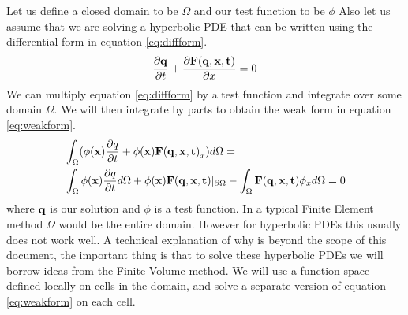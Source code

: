 \documentclass[10]{amsart}
\begin{document}
Let us define a closed domain to be $\Omega$ and our test function to be $\phi$   
Also let us assume that we are solving a hyperbolic PDE that can be written using the differential form in equation
\eqref{eq:diffform}.
\begin{equation}
 \frac{\partial {\bf q}}{\partial t} + \frac{\partial {\bf F(q,x,t)}}{\partial x}=0
 \label{eq:diffform}
\end{equation}
We can multiply equation \ref{eq:diffform} by a test function and integrate over some domain $\Omega$. 
We will then integrate by parts to obtain the weak
form in equation \eqref{eq:weakform}.
\begin{align}
 &\int_{\Omega} (\phi({\bf x}) \frac{\partial q}{\partial t} + \phi({\bf x})  {\bf F(q,x,t)}_x) d\Omega
=\nonumber \\ 
&\int_{\Omega} \phi({\bf x}) \frac{\partial q}{\partial t} d\Omega +  \phi({\bf x}) {\bf F(q,x,t)} |_{\partial \Omega}
 -\int_{\Omega}{\bf F(q,x,t)} \phi_x d\Omega =0 \label{eq:weakform}
 \end{align}
 where ${\bf q}$ is our solution and $\phi$ is a test function. 
 In a typical Finite Element method $\Omega$ would be the entire domain. However for hyperbolic PDEs this usually
 does not work well. A technical explanation of why is beyond the scope of this document, the important thing
 is that to solve these hyperbolic PDEs we will borrow ideas from the Finite Volume method. We will use
 a function space defined locally on cells in the domain, and solve a separate version of equation \eqref{eq:weakform} 
 on each cell.
\end{document}
